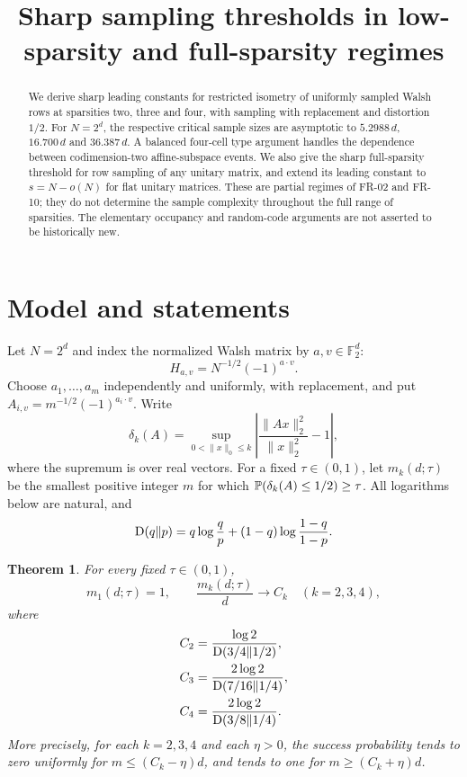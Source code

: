 \documentclass[11pt]{article}
\title{Sharp sampling thresholds in low-sparsity and full-sparsity regimes}
\author{}\date{}
\newtheorem{theorem}{Theorem}\newtheorem{lemma}[theorem]{Lemma}
\theoremstyle{remark}\newtheorem{remark}[theorem]{Remark}
\newcommand{\F}{\mathbb F}\newcommand{\R}{\mathbb R}\newcommand{\C}{\mathbb C}
\begin{document}
\maketitle
\begin{abstract}
We derive sharp leading constants for restricted isometry of uniformly sampled Walsh rows at sparsities two, three and four, with sampling with replacement and distortion $1/2$. For $N=2^d$, the respective critical sample sizes are asymptotic to $5.2988\,d$, $16.700\,d$ and $36.387\,d$. A balanced four-cell type argument handles the dependence between codimension-two affine-subspace events. We also give the sharp full-sparsity threshold for row sampling of any unitary matrix, and extend its leading constant to $s=N-o(N)$ for flat unitary matrices. These are partial regimes of FR-02 and FR-10; they do not determine the sample complexity throughout the full range of sparsities. The elementary occupancy and random-code arguments are not asserted to be historically new.
\end{abstract}

\section{Model and statements}
Let $N=2^d$ and index the normalized Walsh matrix by $a,v\in\F_2^d$:
\[
 H_{a,v}=N^{-1/2}(-1)^{a\cdot v}.
\]
Choose $a_1,\ldots,a_m$ independently and uniformly, with replacement, and put
$A_{i,v}=m^{-1/2}(-1)^{a_i\cdot v}$. Write
\[
 \delta_k(A)=\sup_{0<\|x\|_0\le k}
 \left|\frac{\|Ax\|_2^2}{\|x\|_2^2}-1\right|,
\]
where the supremum is over real vectors. For a fixed $\tau\in(0,1)$, let $m_k(d;\tau)$ be the smallest positive integer $m$ for which
$\mathbb P(\delta_k(A)\le1/2)\ge\tau$. All logarithms below are natural, and
\[
 \operatorname{D}(q\Vert p)=q\log\frac qp+(1-q)\log\frac{1-q}{1-p}.
\]

\begin{theorem}\label{thm:low}
For every fixed $\tau\in(0,1)$,
\[
 m_1(d;\tau)=1,\qquad
 \frac{m_k(d;\tau)}d\longrightarrow C_k\quad(k=2,3,4),
\]
where
\begin{align*}
 C_2&=\frac{\log2}{\operatorname{D}(3/4\Vert1/2)},\\
 C_3&=\frac{2\log2}{\operatorname{D}(7/16\Vert1/4)},\\
 C_4&=\frac{2\log2}{\operatorname{D}(3/8\Vert1/4)}.
\end{align*}
More precisely, for each $k=2,3,4$ and each $\eta>0$, the success probability tends to zero uniformly for $m\le(C_k-\eta)d$, and tends to one for $m\ge(C_k+\eta)d$.
\end{theorem}
\end{document}
